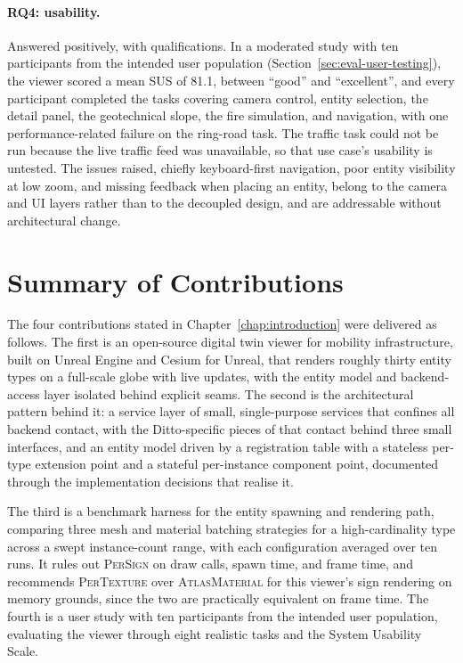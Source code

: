 \paragraph{RQ4: usability.} Answered positively, with qualifications. In a moderated study with ten participants from the intended user population (Section~\ref{sec:eval-user-testing}), the viewer scored a mean SUS of 81.1, between ``good'' and ``excellent'', and every participant completed the tasks covering camera control, entity selection, the detail panel, the geotechnical slope, the fire simulation, and navigation, with one performance-related failure on the ring-road task. The traffic task could not be run because the live traffic feed was unavailable, so that use case's usability is untested. The issues raised, chiefly keyboard-first navigation, poor entity visibility at low zoom, and missing feedback when placing an entity, belong to the camera and UI layers rather than to the decoupled design, and are addressable without architectural change.

\section{Summary of Contributions}
\label{sec:conc-contributions}

The four contributions stated in Chapter~\ref{chap:introduction} were delivered as follows. The first is an open-source digital twin viewer for mobility infrastructure, built on Unreal Engine and Cesium for Unreal, that renders roughly thirty entity types on a full-scale globe with live updates, with the entity model and backend-access layer isolated behind explicit seams. The second is the architectural pattern behind it: a service layer of small, single-purpose services that confines all backend contact, with the Ditto-specific pieces of that contact behind three small interfaces, and an entity model driven by a registration table with a stateless per-type extension point and a stateful per-instance component point, documented through the implementation decisions that realise it.

The third is a benchmark harness for the entity spawning and rendering path, comparing three mesh and material batching strategies for a high-cardinality type across a swept instance-count range, with each configuration averaged over ten runs. It rules out \textsc{PerSign} on draw calls, spawn time, and frame time, and recommends \textsc{PerTexture} over \textsc{AtlasMaterial} for this viewer's sign rendering on memory grounds, since the two are practically equivalent on frame time. The fourth is a user study with ten participants from the intended user population, evaluating the viewer through eight realistic tasks and the System Usability Scale.


